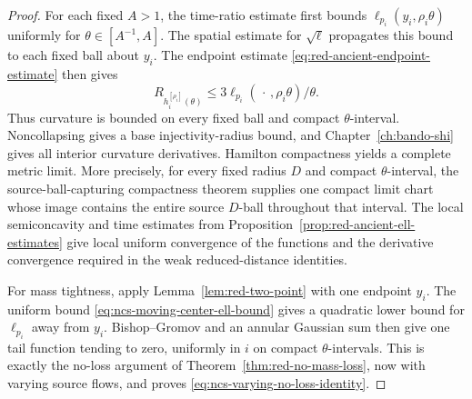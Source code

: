 \documentclass[10pt]{coll-l}
\theoremstyle{definition}
\theoremstyle{remark}
\numberwithin{section}{chapter}
\numberwithin{equation}{chapter}
\begin{document}
\begin{proof}
For each fixed $A>1$, the time-ratio estimate first bounds
$\ell_{p_i}(y_i,\rho_i\theta)$ uniformly for
$\theta\in[A^{-1},A]$.  The spatial estimate for $\sqrt\ell$ propagates
this bound to each fixed ball about $y_i$.  The endpoint estimate
\eqref{eq:red-ancient-endpoint-estimate} then gives
\begin{equation}
 R_{h_i^{[\rho_i]}(\theta)}
       \leq3\ell_{p_i}(\,\cdot\,,\rho_i\theta)/\theta. \label{eq:ncs-varying-endpoint-curvature}
\end{equation}
Thus curvature is bounded on every fixed ball and compact
$\theta$-interval.  Noncollapsing gives a
base injectivity-radius bound, and Chapter~\ref{ch:bando-shi} gives all
interior curvature derivatives.  Hamilton compactness yields a complete
metric limit.  More precisely, for every fixed radius $D$ and compact
$\theta$-interval, the source-ball-capturing compactness theorem supplies
one compact limit chart whose image contains the entire source $D$-ball
throughout that interval.  The local semiconcavity and time estimates from
Proposition~\ref{prop:red-ancient-ell-estimates} give local uniform
convergence of the functions and the derivative convergence required in
the weak reduced-distance identities.

For mass tightness, apply Lemma~\ref{lem:red-two-point} with one endpoint
$y_i$.  The uniform bound \eqref{eq:ncs-moving-center-ell-bound} gives a
quadratic lower bound for $\ell_{p_i}$ away from $y_i$.  Bishop--Gromov and
an annular Gaussian sum then give one tail function tending to zero,
uniformly in $i$ on compact $\theta$-intervals.  This is exactly the
no-loss argument of Theorem~\ref{thm:red-no-mass-loss}, now with varying
source flows, and proves \eqref{eq:ncs-varying-no-loss-identity}.


\end{proof}
\end{document}
